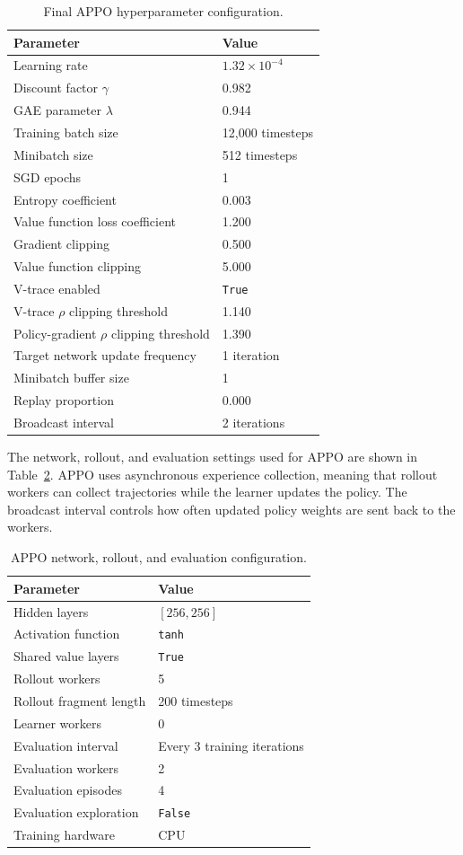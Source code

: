 \documentclass[english,bachelor]{hsluthesis}
\begin{document}
\begin{table}[H]
\centering
\begin{tabular}{l l}
\hline
Parameter & Value \\
\hline
Learning rate & $1.32 \times 10^{-4}$ \\
Discount factor $\gamma$ & 0.982 \\
GAE parameter $\lambda$ & 0.944 \\
Training batch size & 12,000 timesteps \\
Minibatch size & 512 timesteps \\
SGD epochs & 1 \\
Entropy coefficient & 0.003 \\
Value function loss coefficient & 1.200 \\
Gradient clipping & 0.500 \\
Value function clipping & 5.000 \\
V-trace enabled & \texttt{True} \\
V-trace $\rho$ clipping threshold & 1.140 \\
Policy-gradient $\rho$ clipping threshold & 1.390 \\
Target network update frequency & 1 iteration \\
Minibatch buffer size & 1 \\
Replay proportion & 0.000 \\
Broadcast interval & 2 iterations \\
\hline
\end{tabular}
\caption{Final APPO hyperparameter configuration.}
\label{tab:appo_hyperparams}
\end{table}

The network, rollout, and evaluation settings used for APPO are shown in Table~\ref{tab:appo_runtime_config}. APPO uses asynchronous experience collection, meaning that rollout workers can collect trajectories while the learner updates the policy. The broadcast interval controls how often updated policy weights are sent back to the workers.

\begin{table}[H]
\centering
\begin{tabular}{l l}
\hline
Parameter & Value \\
\hline
Hidden layers & $[256, 256]$ \\
Activation function & \texttt{tanh} \\
Shared value layers & \texttt{True} \\
Rollout workers & 5 \\
Rollout fragment length & 200 timesteps \\
Learner workers & 0 \\
Evaluation interval & Every 3 training iterations \\
Evaluation workers & 2 \\
Evaluation episodes & 4 \\
Evaluation exploration & \texttt{False} \\
Training hardware & CPU \\
\hline
\end{tabular}
\caption{APPO network, rollout, and evaluation configuration.}
\label{tab:appo_runtime_config}
\end{table}
\end{document}
